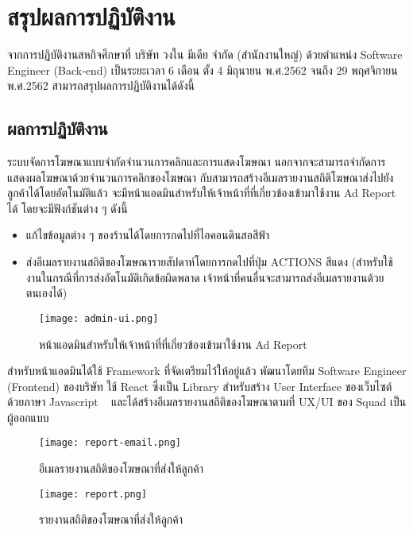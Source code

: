 \chapter{สรุปผลการปฏิบัติงาน}
\label{chapter:summary-result}

 จากการปฏิบัติงานสหกิจศึกษาที่ บริษัท วงใน มีเดีย จำกัด (สำนักงานใหญ่) ด้วยตำแหน่ง Software Engineer (Back-end) เป็นระยะเวลา 6 เดือน ตั้ง 4 มิถุนายน พ.ศ.2562 จนถึง 29 พฤศจิกายน พ.ศ.2562 สามารถสรุปผลการปฏิบัติงานได้ดังนี้
 
 \section{ผลการปฏิบัติงาน}
ระบบจัดการโฆษณาแบบจำกัดจำนวนการคลิกและการแสดงโฆษณา นอกจากจะสามารถจำกัดการแสดงผลโฆษณาด้วยจำนวนการคลิกของโฆษณา กับสามารถสร้างอีเมลรายงานสถิติโฆษณาส่งไปยังลูกค้าได้โดยอัตโนมัติแล้ว จะมีหน้าแอดมินสำหรับให้เจ้าหน้าที่ที่เกี่ยวข้องเข้ามาใช้งาน Ad Report ได้ โดยจะมีฟังก์ชันต่าง ๆ ดังนี้
\begin{itemize}
	\item แก้ไขข้อมูลต่าง ๆ ของร้านได้โดยการกดไปที่ไอคอนดินสอสีฟ้า
	\item ส่งอีเมลรายงานสถิติของโฆษณารายสัปดาห์โดยการกดไปที่ปุ่ม ACTIONS สีแดง  (สำหรับใช้งานในกรณีที่การส่งอัตโนมัติเกิดข้อผิดพลาด เจ้าหน้าที่คนอื่นจะสามารถส่งอีเมลรายงานด้วยตนเองได้) 
\end{itemize}

\begin{figure}[!h]
	\centering
	\texttt{[image: admin-ui.png]}  
	\caption{หน้าแอดมินสำหรับให้เจ้าหน้าที่ที่เกี่ยวข้องเข้ามาใช้งาน Ad Report}
	\label{Fig:admin-ui}
\end{figure}

สำหรับหน้าแอดมินได้ใช้ Framework ที่จัดเตรียมไว้ให้อยู่แล้ว พัฒนาโดยทีม Software Engineer (Frontend) ของบริษัท ใช้ React ซึ่งเป็น Library สำหรับสร้าง User Interface ของเว็บไซต์ด้วยภาษา Javascript ~\cite{react} และได้สร้างอีเมลรายงานสถิติของโฆษณาตามที่ UX/UI ของ Squad เป็นผู้ออกแบบ

\begin{figure}[!h]
	\centering
	\texttt{[image: report-email.png]}  
	\caption{อีเมลรายงานสถิติของโฆษณาที่ส่งให้ลูกค้า}
	\label{Fig:report-email}
\end{figure}

\begin{figure}[!h]
	\centering
	\texttt{[image: report.png]}  
	\caption{รายงานสถิติของโฆษณาที่ส่งให้ลูกค้า}
	\label{Fig:report}
\end{figure}

